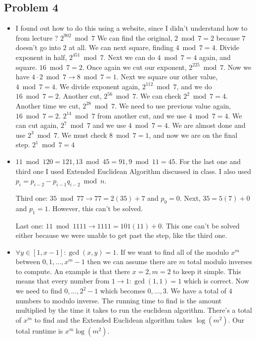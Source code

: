 \documentclass[11pt]{article}
\begin{document}
\subsection*{Problem 4}
\begin{itemize}
\item I found out how to do this using a website, since I didn't understand how to from lecture ? $2^{902} \bmod 7$ We can find the original, $2 \bmod 7 = 2$ because $7$ doesn't go into $2$ at all. We can next square, finding $4 \bmod 7 = 4$. Divide exponent in half, $2^{451} \bmod 7$. Next we can do $4 \bmod 7 = 4$ again, and square. $16 \bmod 7 = 2$. Once again we cut our exponent, $2^{225} \bmod 7$. Now we have $4 \cdot 2 \bmod 7 \to 8 \bmod 7 = 1$. Next we square our other value, $4 \bmod 7 = 4$. We divide exponent again, $2^{112} \bmod 7$, and we do $16 \bmod 7 = 2$. Another cut, $2^{56} \bmod 7$. We can check $2^2 \bmod 7 = 4$. Another time we cut, $2^{28} \bmod 7$. We need to use previous value again, $16 \bmod 7 = 2$. $2^{14} \bmod 7$ from another cut, and we use $4 \bmod 7 = 4$. We can cut again, $2^7 \bmod 7$ and we use $4 \bmod 7 = 4$. We are almost done and use $2^3 \bmod 7$. We must check $8 \bmod 7 = 1$, and now we are on the final step. $2^1 \bmod 7 = 4$

\item $11 \bmod 120 = 121, 13 \bmod 45 = 91, 9 \bmod 11 = 45$. For the last one and third one I used Extended Euclidean Algorithm discussed in class. I also used $p_i = p_{i-2} - p_{i-1} q_{i-2} \bmod n$.


Third one: $35 \bmod 77 \to 77 = 2(35) + 7$ and $p_0 = 0$. Next, $35 = 5(7) + 0$ and $p_1 = 1$. However, this can't be solved.

Last one: $11 \bmod 1111 \to 1111 = 101(11) + 0$. This one can't be solved either because we were unable to get past the step, like the third one.

\item $\forall y \in [1,x-1]: \gcd(x,y) = 1$. If we want to find all of the modulo $x^m$ between $0,1,...,x^m -1$ then we can assume there are $m$ total modulo inverses to compute. An example is that there $x = 2, m = 2$ to keep it simple. This means that every number from $1 \to 1: \gcd(1,1) = 1$ which is correct. Now we need to find $0,...,2^2-1$ which becomes $0,...,3$. We have a total of $4$ numbers to modulo inverse. The running time to find is the amount multiplied by the time it takes to run the euclidean algorithm. There's a total of $x^m$ to find and the Extended Euclidean algorithm takes $\log(m^2)$. Our total runtime is $x^m \log(m^2)$.

\end{itemize}
\end{document}

